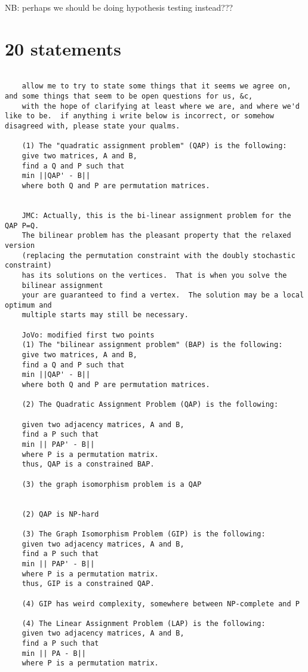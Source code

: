 NB: perhaps we should be doing hypothesis testing instead???


\section{20 statements}

\begin{verbatim}

	allow me to try to state some things that it seems we agree on, and some things that seem to be open questions for us, &c,
	with the hope of clarifying at least where we are, and where we'd like to be.  if anything i write below is incorrect, or somehow disagreed with, please state your qualms.

	(1) The "quadratic assignment problem" (QAP) is the following:  
	give two matrices, A and B,
	find a Q and P such that
	min ||QAP' - B||
	where both Q and P are permutation matrices.


	JMC: Actually, this is the bi-linear assignment problem for the QAP P=Q.
	The bilinear problem has the pleasant property that the relaxed version
	(replacing the permutation constraint with the doubly stochastic constraint)
	has its solutions on the vertices.  That is when you solve the
	bilinear assignment
	your are guaranteed to find a vertex.  The solution may be a local optimum and
	multiple starts may still be necessary.
	
	JoVo: modified first two points
	(1) The "bilinear assignment problem" (BAP) is the following:  
	give two matrices, A and B,
	find a Q and P such that
	min ||QAP' - B||
	where both Q and P are permutation matrices.

	(2) The Quadratic Assignment Problem (QAP) is the following:

	given two adjacency matrices, A and B,
	find a P such that
	min || PAP' - B||
	where P is a permutation matrix.
	thus, QAP is a constrained BAP.

	(3) the graph isomorphism problem is a QAP
	
	
	(2) QAP is NP-hard

	(3) The Graph Isomorphism Problem (GIP) is the following:
	given two adjacency matrices, A and B,
	find a P such that
	min || PAP' - B||
	where P is a permutation matrix.
	thus, GIP is a constrained QAP.

	(4) GIP has weird complexity, somewhere between NP-complete and P

	(4) The Linear Assignment Problem (LAP) is the following:
	given two adjacency matrices, A and B,
	find a P such that
	min || PA - B||
	where P is a permutation matrix.


\end{verbatim}
